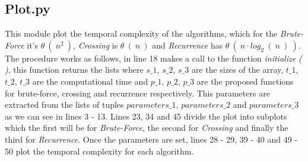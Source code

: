 \subsection{Plot.py}

This module plot the temporal complexity of the algorithms, which for the {\itshape Brute-Force} it's $\theta\ (\ n^{2}\ )$, {\itshape Crossing} is $\theta\ (\ n\ )$ and {\itshape Recurrence} has $\theta\ (\ n \cdot log_{2}\ (\ n\ )\ )$. The procedure works as follows, in line 18 makes a call to the function {\itshape initialize ( )}, this function returns the lists where $s\_1$, $s\_2$, $s\_3$ are the sizes of the array, $t\_1$, $t\_2$, $t\_3$ are the computational time and $p\_1$, $p\_2$, $p\_3$ are the proposed functions for brute-force, crossing and recurrence respectively. This parameters are extracted from the lists of tuples $parameters\_1$, $parameters\_2$ and $parameters\_3$ as we can see in lines 3 - 13. Lines 23, 34 and 45 divide the plot into subplots which the first will be for {\itshape Brute-Force}, the second for {\itshape Crossing} and finally the third for {\itshape Recurrence}. Once the parameters are set, lines 28 - 29, 39 - 40 and 49 - 50 plot the temporal complexity for each algorithm. \hfill \break

